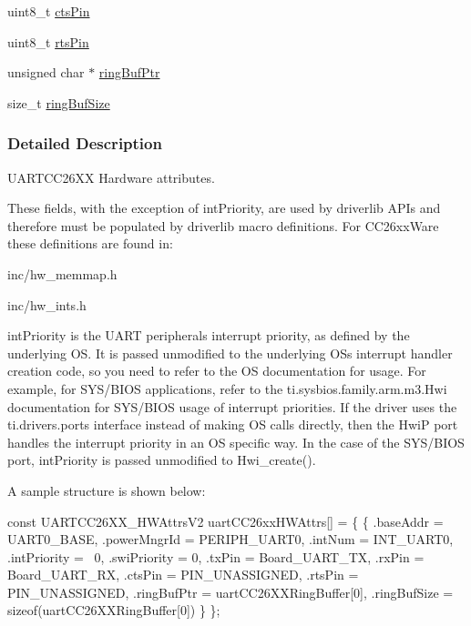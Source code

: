 \begin{DoxyCompactItemize}
\item 
uint8\+\_\+t \hyperlink{struct_u_a_r_t_c_c26_x_x___h_w_attrs_v2_ad999164f2ccf4f229fa56e19711e93e5}{cts\+Pin}
\item 
uint8\+\_\+t \hyperlink{struct_u_a_r_t_c_c26_x_x___h_w_attrs_v2_a7c7c0bf162bb8518251e683e0665e5c3}{rts\+Pin}
\item 
unsigned char $\ast$ \hyperlink{struct_u_a_r_t_c_c26_x_x___h_w_attrs_v2_aefd6d29db9c97680fae7de8c9ecc0cc3}{ring\+Buf\+Ptr}
\item 
size\+\_\+t \hyperlink{struct_u_a_r_t_c_c26_x_x___h_w_attrs_v2_a63f6ad063feb518a1d453e550b0a4dcb}{ring\+Buf\+Size}
\end{DoxyCompactItemize}


\subsubsection{Detailed Description}
U\+A\+R\+T\+C\+C26\+X\+X Hardware attributes. 

These fields, with the exception of int\+Priority, are used by driverlib A\+P\+Is and therefore must be populated by driverlib macro definitions. For C\+C26xx\+Ware these definitions are found in\+:
\begin{DoxyItemize}
\item inc/hw\+\_\+memmap.\+h
\item inc/hw\+\_\+ints.\+h
\end{DoxyItemize}

int\+Priority is the U\+A\+R\+T peripheral\textquotesingle{}s interrupt priority, as defined by the underlying O\+S. It is passed unmodified to the underlying O\+S\textquotesingle{}s interrupt handler creation code, so you need to refer to the O\+S documentation for usage. For example, for S\+Y\+S/\+B\+I\+O\+S applications, refer to the ti.\+sysbios.\+family.\+arm.\+m3.\+Hwi documentation for S\+Y\+S/\+B\+I\+O\+S usage of interrupt priorities. If the driver uses the ti.\+drivers.\+ports interface instead of making O\+S calls directly, then the Hwi\+P port handles the interrupt priority in an O\+S specific way. In the case of the S\+Y\+S/\+B\+I\+O\+S port, int\+Priority is passed unmodified to Hwi\+\_\+create().

A sample structure is shown below\+: 
\begin{DoxyCode}
\textcolor{keyword}{const} UARTCC26XX_HWAttrsV2 uartCC26xxHWAttrs[] = \{
    \{
        .baseAddr    = UART0\_BASE,
        .powerMngrId = PERIPH\_UART0,
        .intNum      = INT\_UART0,
        .intPriority = ~0,
        .swiPriority = 0,
        .txPin       = Board\_UART\_TX,
        .rxPin       = Board\_UART\_RX,
        .ctsPin      = PIN_UNASSIGNED,
        .rtsPin      = PIN_UNASSIGNED,
        .ringBufPtr  = uartCC26XXRingBuffer[0],
        .ringBufSize = \textcolor{keyword}{sizeof}(uartCC26XXRingBuffer[0])
    \}
\};
\end{DoxyCode}


